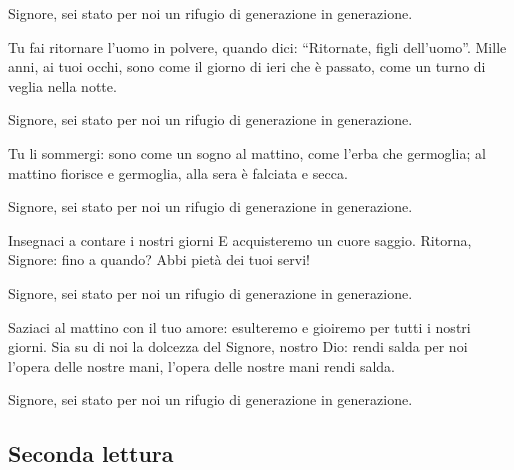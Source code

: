 	\begin{dialoghisalmo}
		\item[\assemblea] {Signore, sei stato per noi un rifugio di generazione in generazione.}
		\item[\lettore] Tu fai ritornare l'uomo in polvere,
		quando dici: \textquotedblleft Ritornate, figli dell'uomo\textquotedblright.
		Mille anni, ai tuoi occhi,
		sono come il giorno di ieri che è passato,
		come un turno di veglia nella notte.
		\item[\assemblea] {Signore, sei stato per noi un rifugio di generazione in generazione.}
		\item[\lettore] Tu li sommergi:
		sono come un sogno al mattino,
		come l'erba che germoglia;
		al mattino fiorisce e germoglia,
		alla sera è falciata e secca.
		\item[\assemblea] {Signore, sei stato per noi un rifugio di generazione in generazione.}
		\item[\lettore] Insegnaci a contare i nostri giorni
		E acquisteremo un cuore saggio.
		Ritorna, Signore: fino a quando?
		Abbi pietà dei tuoi servi!
		\item[\assemblea] {Signore, sei stato per noi un rifugio di generazione in generazione.}
		\item[\lettore] Saziaci al mattino con il tuo amore:
		esulteremo e gioiremo per tutti i nostri giorni.
		Sia su di noi la dolcezza del Signore, nostro Dio:
		rendi salda per noi l'opera delle nostre mani,
		l'opera delle nostre mani rendi salda.
		\item[\assemblea] {Signore, sei stato per noi un rifugio di generazione in generazione.}
	\end{dialoghisalmo}

\subsection*{Seconda lettura}

